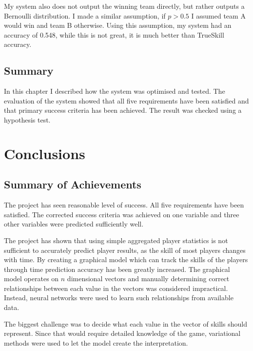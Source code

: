 \documentclass[12pt,a4paper]{book}
\begin{document}
My system also does not output the winning team directly, but rather outputs a Bernoulli distribution.
I made a similar assumption, if $p > 0.5$ I assumed team A would win and team B otherwise.
Using this assumption, my system had an accuracy of 0.548, while this is not great, it is much better than TrueSkill accuracy.

\section{Summary}
In this chapter I described how the system was optimised and tested.
The evaluation of the system showed that all five requirements have been satisfied and that primary success criteria has been achieved.
The result was checked using a hypothesis test.

\chapter{Conclusions}
\section{Summary of Achievements}
The project has seen reasonable level of success.
All five requirements have been satisfied.
The corrected success criteria was achieved on one variable and three other variables were predicted sufficiently well.

The project has shown that using simple aggregated player statistics is not sufficient to accurately predict player results, as the skill of most players changes with time.
By creating a graphical model which can track the skills of the players through time prediction accuracy has been greatly increased.
The graphical model operates on $n$ dimensional vectors and manually determining correct relationships between each value in the vectors was considered impractical.
Instead, neural networks were used to learn such relationships from available data.

The biggest challenge was to decide what each value in the vector of skills should represent.
Since that would require detailed knowledge of the game, variational methods were used to let the model create the interpretation.
\end{document}
